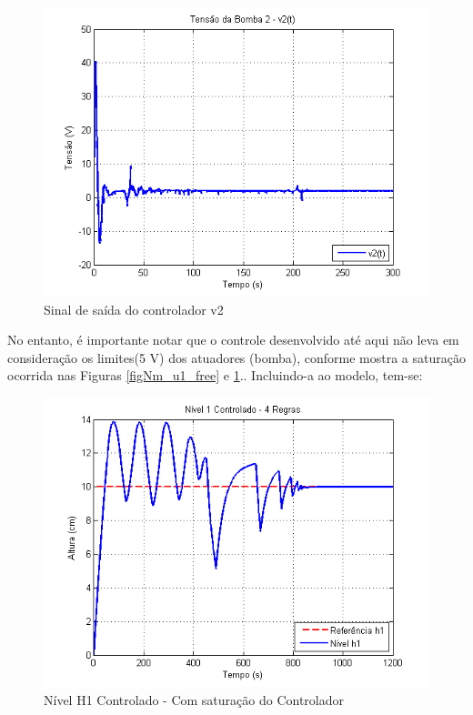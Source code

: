 \begin{figure}[H]
	\centering
	\includegraphics[height=0.35\paperheight, keepaspectratio]{img/nm_u2_free.png}
	\caption{Sinal de saída do controlador v2 }
	\label{figNm_u2_free}
\end{figure}

No entanto, é importante notar que o controle desenvolvido até aqui não leva em consideração os limites(5 V) dos atuadores (bomba),  conforme mostra a saturação ocorrida nas Figuras \ref{figNm_u1_free} e \ref{figNm_u2_free}.. Incluindo-a ao modelo, tem-se:

\begin{figure}[H]
	\centering
	\includegraphics[height=0.35\paperheight, keepaspectratio]{img/nm_ctrl_h1ts2_ulim.png}
	\caption{\small Nível H1 Controlado - Com saturação do Controlador }
	\label{figH1TSCtrl2_ulim_nm}
\end{figure}

